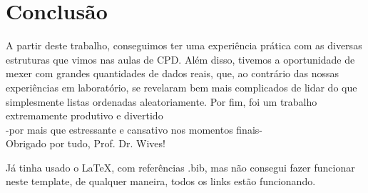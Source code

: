 \documentclass[ecp,tc]{iiufrgs}
\begin{document}
\chapter{Conclusão}
A partir deste trabalho, conseguimos ter uma experiência prática com as diversas estruturas que vimos nas aulas de CPD. Além disso, tivemos a oportunidade de mexer com grandes quantidades de dados reais, que, ao contrário das nossas experiências em laboratório, se revelaram bem mais complicados de lidar do que simplesmente listas ordenadas aleatoriamente. Por fim, foi um trabalho extremamente produtivo e divertido \\ -por mais que estressante e cansativo nos momentos finais- \\[1em]
Obrigado por tudo, Prof. Dr. Wives!





Já tinha usado o \LaTeX, com referências .bib, mas não consegui fazer funcionar neste template, de qualquer maneira, todos os links estão funcionando.
\end{document}
